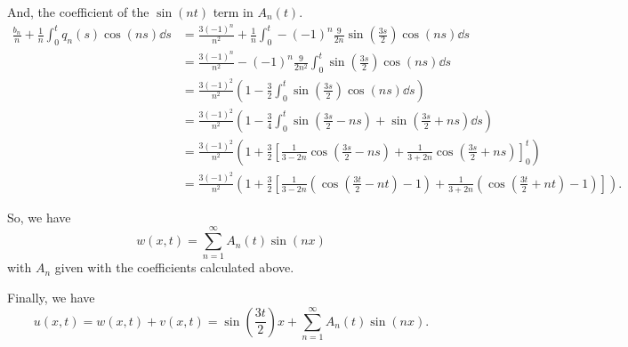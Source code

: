 \documentclass[plain]{pset}
\begin{document}
\begin{solution}
    And, the coefficient of the \(\sin(nt)\) term in \(A_n(t)\).
    \begin{align*}
        \frac{b_n}{n} + \frac{1}{n}\int_0^t q_n(s)\cos(ns) \dd{s} & = \frac{3(-1)^n}{n^2} + \frac{1}{n}\int_0^t -(-1)^n\frac{9}{2n}\sin\left(\frac{3s}{2}\right)\cos(ns) \dd{s}                                                                                            \\
                                                                  & = \frac{3(-1)^n}{n^2} - (-1)^n\frac{9}{2n^2}\int_0^t \sin\left(\frac{3s}{2}\right)\cos(ns) \dd{s}                                                                                                      \\
                                                                  & = \frac{3(-1)^2}{n^2}\left(1-\frac{3}{2} \int_0^t \sin\left(\frac{3s}{2}\right)\cos(ns) \dd{s}\right)                                                                                                  \\
                                                                  & = \frac{3(-1)^2}{n^2}\left(1-\frac{3}{4}\int_0^t \sin\left(\frac{3s}{2} - ns\right) + \sin\left(\frac{3s}{2} + ns\right) \dd{s}\right)                                                                 \\
                                                                  & = \frac{3(-1)^2}{n^2}\left(1+\frac{3}{2}\left[\frac{1}{3 - 2n}\cos\left(\frac{3s}{2} - ns\right) + \frac{1}{3 + 2n}\cos\left(\frac{3s}{2} + ns\right)\right]_0^t\right)                                \\
                                                                  & = \frac{3(-1)^2}{n^2}\left(1+\frac{3}{2}\left[\frac{1}{3 - 2n}\left(\cos\left(\frac{3t}{2} - nt\right) - 1\right) + \frac{1}{3 + 2n}\left(\cos\left(\frac{3t}{2} + nt\right) - 1\right)\right]\right).
    \end{align*}

    So, we have
    \[w(x, t) = \sum_{n = 1}^\infty A_n(t) \sin(nx)\]
    with \(A_n\) given with the coefficients calculated above.

    Finally, we have
    \[u(x, t) = w(x, t) + v(x, t) = \sin\left(\frac{3t}{2}\right)x + \sum_{n = 1}^\infty A_n(t) \sin(nx).\]


\end{solution}
\end{document}
